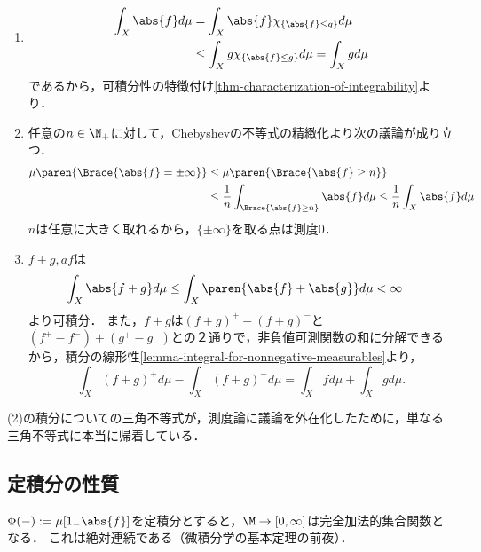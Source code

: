 \documentclass[uplatex, dvipdfmx]{jsreport}
\begin{document}
\begin{Proof}
\begin{enumerate}
        $\Rightarrow$は，
        $\forall_{A\in\B}\;\int_Afd\mu=0$が従うことからわかる．実際，任意の$A\in\B$に対して，(2)も使って，
        \begin{align*}
            \Abs{\iint_Afd\mu}&\le\int_A\abs{f}d\mu\le\int_X\abs{f}d\mu=0.
        \end{align*}
        \item 
        \begin{align*}
            \int_X\abs{f}d\mu&=\int_X\abs{f}\chi_{\{\abs{f}\le g\}}d\mu\\
            &\le\int_Xg\chi_{\{\abs{f}\le g\}}d\mu=\int_Xgd\mu
        \end{align*}
        であるから，可積分性の特徴付け\ref{thm-characterization-of-integrability}より．
        \item 任意の$n\in\N_+$に対して，Chebyshevの不等式の精緻化より次の議論が成り立つ．
        \begin{align*}
            \mu\paren{\Brace{\abs{f}=\pm\infty}}&\le\mu\paren{\Brace{\abs{f}\ge n}}\\
            &\le\frac{1}{n}\int_{\Brace{\abs{f}\ge n}}\abs{f}d\mu\le\frac{1}{n}\int_X\abs{f}d\mu
        \end{align*}
        $n$は任意に大きく取れるから，$\{\pm\infty\}$を取る点は測度$0$．
        \item $f+g,af$は
        \begin{align*}
            \int_X\abs{f+g}d\mu&\le\int_X\paren{\abs{f}+\abs{g}}d\mu<\infty
        \end{align*}
        より可積分．
        また，$f+g$は$(f+g)^+-(f+g)^-$と$(f^+-f^-)+(g^+-g^-)$との２通りで，非負値可測関数の和に分解できるから，積分の線形性\ref{lemma-integral-for-nonnegative-measurables}より，
        \[\int_X(f+g)^+d\mu-\int_X(f+g)^-d\mu=\int_Xfd\mu+\int_Xgd\mu.\]
    \end{enumerate}
\end{Proof}
\begin{remarks}
    (2)の積分についての三角不等式が，測度論に議論を外在化したために，単なる三角不等式に本当に帰着している．
\end{remarks}

\subsection{定積分の性質}

\begin{tcolorbox}[colframe=ForestGreen, colback=ForestGreen!10!white,breakable,colbacktitle=ForestGreen!40!white,coltitle=black,fonttitle=\bfseries\sffamily,
title=]
    $\Phi(-):=\mu[1_-\abs{f}]$を定積分とすると，$\M\to[0,\infty]$は完全加法的集合関数となる．
    これは絶対連続である（微積分学の基本定理の前夜）．
\end{tcolorbox}
\end{document}
